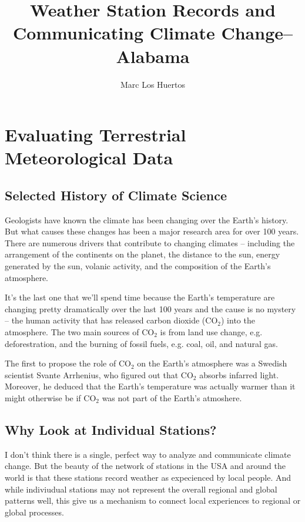 \documentclass{article}\usepackage[]{graphicx}\usepackage[]{color}
\title{Weather Station Records and Communicating Climate Change--Alabama}
\author{Marc Los Huertos}
\begin{document}
\maketitle

\tableofcontents

\section{Evaluating Terrestrial Meteorological Data}

\subsection{Selected History of Climate Science}

Geologists have known the climate has been changing over the Earth's history. But what causes these changes has been a major research area for over 100 years. There are numerous drivers that contribute to changing climates -- including the arrangement of the continents on the planet, the distance to the sun, energy generated by the sun, volanic activity, and the composition of the Earth's atmosphere. 

It's the last one that we'll spend time because the Earth's temperature are changing pretty dramatically over the last 100 years and the cause is no mystery -- the human activity that has released carbon dioxide (CO$_2$) into the atmosphere. The two main sources of CO$_2$ is from land use change, e.g. deforestration, and the burning of fossil fuels, e.g. coal, oil, and natural gas. 

The first to propose the role of CO$_2$ on the Earth's atmosphere was a Swedish scientist Svante Arrhenius, who figured out that CO$_2$ absorbs infarred light. Moreover, he deduced that the Earth's temperature was actually warmer than it might otherwise be if CO$_2$ was not part of the Earth's atmoshere. 

\subsection{Why Look at Individual Stations?}

I don't think there is a single, perfect way to analyze and communicate climate change. But the beauty of the network of stations in the USA and around the world is that these stations record weather as expecienced by local people. And while indiviudual stations may not represent the overall regional and global patterns well, this give us a mechanism to connect local experiences to regional or global processes. 
\end{document}
